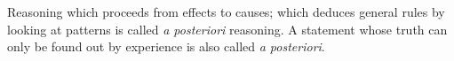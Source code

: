 Reasoning which proceeds from effects to causes; which deduces
general rules by looking at patterns is called \emph{a posteriori} reasoning.
A statement whose truth can only be found out by experience
is also called \emph{a posteriori}.